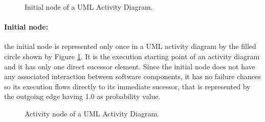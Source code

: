 \begin{figure}[h!]
\begin{center}
\end{center}
\caption{Initial node of a UML Activity Diagram.}
\label{fig:initial_AD}
\end{figure}

\paragraph{Initial node: \label{par:initialNodeModeling}} the initial node is
represented only once in a UML activity diagram by the filled circle shown by
Figure \ref{fig:initial_AD}. It is the execution starting  point of an activity
diagram and it has only one direct sucessor element. Since the initial node does
not have any associated interaction between software components, it has no failure chances so its execution
flows directly to its immediate sucessor, that is represented by the outgoing
edge having 1.0 as probability value.


\begin{figure}[h!]
\begin{center}
\end{center}
\caption{Activity node of a UML Activity Diagram.}
\label{fig:activity_AD}
\end{figure}

